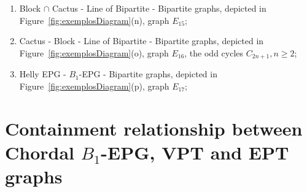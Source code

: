 \documentclass[9pt]{entcs}
\newtheorem{defi}{Definition}[section]
\begin{document}
\begin{enumerate}[label=(\arabic*)]
      \item Block $\cap$  Cactus -  Line of Bipartite - Bipartite graphs, depicted in Figure~\ref{fig:exemplosDiagram}(n), graph $E_{15}$;%
      \item Cactus - Block -  Line of Bipartite - Bipartite graphs, depicted in Figure~\ref{fig:exemplosDiagram}(o), graph $E_{16}$, the odd cycles $C_{2n+1},n\geq 2$;%
      \item Helly EPG - $B_1$-EPG  - Bipartite graphs, depicted in Figure~\ref{fig:exemplosDiagram}(p), graph  $E_{17}$;%
\end{enumerate}





    




\section{Containment relationship between Chordal $B_1$-EPG, VPT and EPT graphs }
\end{document}
